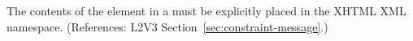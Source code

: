 The contents of the  element in a \Constraint must be
explicitly placed in the XHTML XML namespace.  (References: L2V3
Section~\ref{sec:constraint-message}.)
